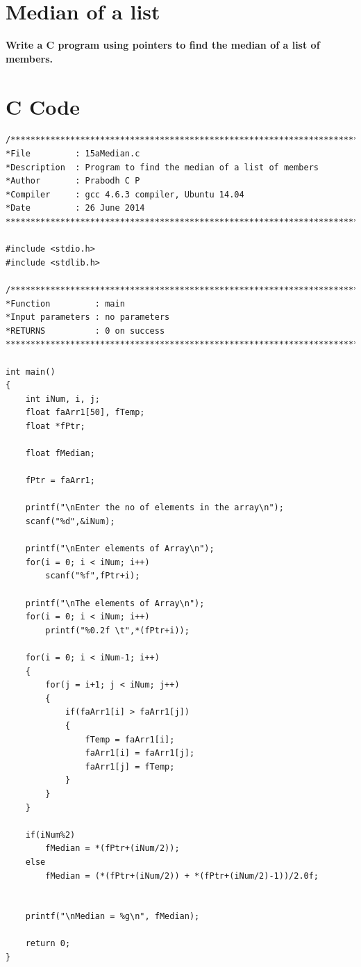 \documentclass[a4paper]{report}
\begin{document}
\section{Median of a list}	
{\selectfont \textbf{Write a C program using pointers to find the median of a list of members.
}}

\section*{C Code}

\begin{Verbatim}
/***************************************************************************
*File         : 15aMedian.c
*Description  : Program to find the median of a list of members
*Author       : Prabodh C P
*Compiler     : gcc 4.6.3 compiler, Ubuntu 14.04
*Date         : 26 June 2014
***************************************************************************/

#include <stdio.h>
#include <stdlib.h>

/***************************************************************************
*Function         :	main
*Input parameters :	no parameters
*RETURNS          :	0 on success
***************************************************************************/

int main()
{
    int iNum, i, j;
    float faArr1[50], fTemp;
    float *fPtr;

    float fMedian;

    fPtr = faArr1;

    printf("\nEnter the no of elements in the array\n");
    scanf("%d",&iNum);

    printf("\nEnter elements of Array\n");
    for(i = 0; i < iNum; i++)
        scanf("%f",fPtr+i);

    printf("\nThe elements of Array\n");
    for(i = 0; i < iNum; i++)
        printf("%0.2f \t",*(fPtr+i));

    for(i = 0; i < iNum-1; i++)
    {
        for(j = i+1; j < iNum; j++)
        {
            if(faArr1[i] > faArr1[j])
            {
                fTemp = faArr1[i];
                faArr1[i] = faArr1[j];
                faArr1[j] = fTemp;
            }
        }
    }

    if(iNum%2)
        fMedian = *(fPtr+(iNum/2));
    else
        fMedian = (*(fPtr+(iNum/2)) + *(fPtr+(iNum/2)-1))/2.0f;


    printf("\nMedian = %g\n", fMedian);

    return 0;
}

\end{Verbatim}
\end{document}
